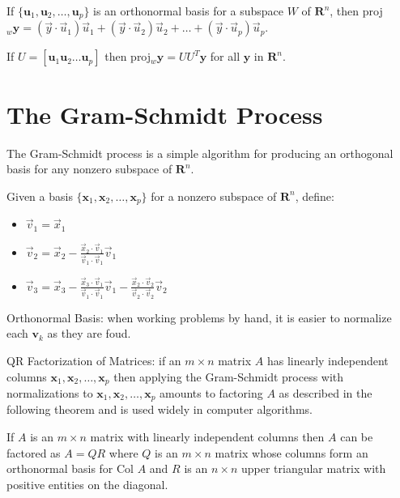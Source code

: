 \documentclass[../linalg.tex]{subfiles}
\begin{document}
\begin{theorem}
    If $\{\textbf{u}_1,\textbf{u}_2,\dots,\textbf{u}_p\}$ is an orthonormal basis for a subspace $W$ of $\textbf{R}^n$, then proj$_w \textbf{y}=(\vec{y}\cdot\vec{u}_1)\vec{u}_1+(\vec{y}\cdot \vec{u}_2)\vec{u}_2+\dots+(\vec{y}\cdot\vec{u}_p)\vec{u}_p$.

    If $U = [\textbf{u}_1 \textbf{u}_2 \dots \textbf{u}_p]$ then proj$_w \textbf{y}=UU^T\textbf{y}$ for all $\textbf{y}$ in $\textbf{R}^n$.
\end{theorem}

\section{The Gram-Schmidt Process}
The Gram-Schmidt process is a simple algorithm for producing an orthogonal basis for any nonzero subspace of $\textbf{R}^n$.

\begin{theorem}
    Given a basis $\{\textbf{x}_1,\textbf{x}_2,\dots,\textbf{x}_p\}$ for a nonzero subspace of $\textbf{R}^n$, define:
    \begin{itemize}
        \item $\vec{v}_1=\vec{x}_1$
        \item $\vec{v}_2=\vec{x}_2-\frac{\vec{x}_2\cdot \vec{v}_1}{\vec{v}_1\cdot \vec{v}_1}\vec{v}_1$
        \item $\vec{v}_3=\vec{x}_3-\frac{\vec{x}_3\cdot \vec{v}_1}{\vec{v}_1\cdot \vec{v}_1}\vec{v}_1-\frac{\vec{x}_2\cdot \vec{v}_2}{\vec{v}_2\cdot \vec{v}_2}\vec{v}_2$
    \end{itemize}
\end{theorem}

Orthonormal Basis: when working problems by hand, it is easier to normalize each $\textbf{v}_k$ as they are foud.

QR Factorization of Matrices: if an $m\times n$ matrix $A$ has linearly independent columns $\textbf{x}_1,\textbf{x}_2,\dots,\textbf{x}_p$ then applying the Gram-Schmidt process with normalizations to 
$\textbf{x}_1,\textbf{x}_2,\dots,\textbf{x}_p$ amounts to factoring $A$ as described in the following theorem and is used widely in computer algorithms.
\begin{theorem}
    If $A$ is an $m\times n$ matrix with linearly independent columns then $A$ can be factored as $A=QR$ where $Q$ is an $m\times n$ matrix whose columns form an orthonormal basis for Col $A$ and $R$ is an $n\times n$ upper triangular matrix with positive entities on the diagonal.
\end{theorem}
\end{document}
